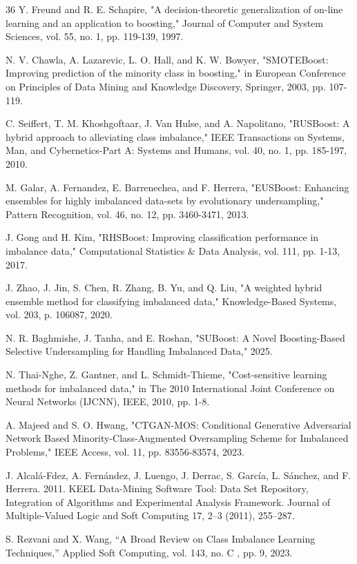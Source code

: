 \documentclass[sigconf]{acmart}
\begin{document}
\begin{thebibliography}{36}
 Y. Freund and R. E. Schapire, "A decision-theoretic generalization of on-line learning and an application to boosting," Journal of Computer and System Sciences, vol. 55, no. 1, pp. 119-139, 1997.

 N. V. Chawla, A. Lazarevic, L. O. Hall, and K. W. Bowyer, "SMOTEBoost: Improving prediction of the minority class in boosting," in European Conference on Principles of Data Mining and Knowledge Discovery, Springer, 2003, pp. 107-119.

 C. Seiffert, T. M. Khoshgoftaar, J. Van Hulse, and A. Napolitano, "RUSBoost: A hybrid approach to alleviating class imbalance," IEEE Transactions on Systems, Man, and Cybernetics-Part A: Systems and Humans, vol. 40, no. 1, pp. 185-197, 2010.

 M. Galar, A. Fernandez, E. Barrenechea, and F. Herrera, "EUSBoost: Enhancing ensembles for highly imbalanced data-sets by evolutionary undersampling," Pattern Recognition, vol. 46, no. 12, pp. 3460-3471, 2013.

 J. Gong and H. Kim, "RHSBoost: Improving classification performance in imbalance data," Computational Statistics \& Data Analysis, vol. 111, pp. 1-13, 2017.

 J. Zhao, J. Jin, S. Chen, R. Zhang, B. Yu, and Q. Liu, "A weighted hybrid ensemble method for classifying imbalanced data," Knowledge-Based Systems, vol. 203, p. 106087, 2020.

 N. R. Baghmishe, J. Tanha, and E. Roshan, "SUBoost: A Novel Boosting-Based Selective Undersampling for Handling Imbalanced Data," 2025.

 N. Thai-Nghe, Z. Gantner, and L. Schmidt-Thieme, "Cost-sensitive learning methods for imbalanced data," in The 2010 International Joint Conference on Neural Networks (IJCNN), IEEE, 2010, pp. 1-8.

 A. Majeed and S. O. Hwang, "CTGAN-MOS: Conditional Generative Adversarial Network Based Minority-Class-Augmented Oversampling Scheme for Imbalanced Problems," IEEE Access, vol. 11, pp. 83556-83574, 2023.

 J. Alcalá-Fdez, A. Fernández, J. Luengo, J. Derrac, S. García, L. Sánchez, and F. Herrera. 2011. KEEL Data-Mining Software Tool: Data Set Repository, Integration of Algorithms and Experimental Analysis Framework. Journal of Multiple-Valued Logic and Soft Computing 17, 2–3 (2011), 255–287.

 S. Rezvani and X. Wang, “A Broad Review on Class Imbalance Learning Techniques,” Applied Soft Computing, vol. 143, no. C , pp. 9, 2023.


\end{thebibliography}
\end{document}
